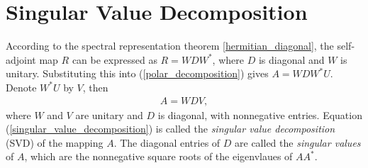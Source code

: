 \documentclass[11pt]{book}
\theoremstyle{definition}
\numberwithin{equation}{chapter}
\begin{document}
\section{Singular Value Decomposition}

According to the spectral representation theorem \ref{hermitian_diagonal}, the self-adjoint map $R$ can be expressed as $R = WDW^*$, where $D$ is diagonal and $W$ is unitary. Substituting this into (\ref{polar_decomposition}) gives $A = WDW^* U$. Denote $W^*U$ by $V$, then 
\begin{align}\label{singular_value_decomposition}
    A = WDV,
\end{align}
where $W$ and $V$ are unitary and $D$ is diagonal, with nonnegative entries. Equation (\ref{singular_value_decomposition}) is called the {\em singular value decomposition} (SVD) of the mapping $A$. The diagonal entries of $D$ are called the {\em singular values} of $A$, which are the nonnegative square roots of the eigenvlaues of $AA^*$. 

\medskip
\end{document}
